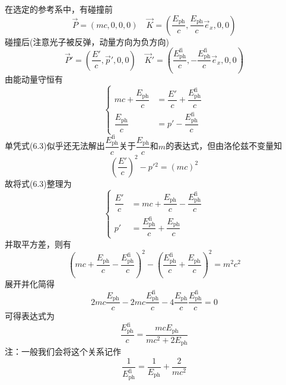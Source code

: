 \begin{solution}
在选定的参考系中，有碰撞前
\begin{equation}
	\vec{P} = (mc,0,0,0)\quad\vec{K}=(\dfrac{E_{\mathrm{ph}}}{c},\dfrac{E_{\mathrm{ph}}}{c}\vec{e}_x,0,0)
\end{equation}
碰撞后(注意光子被反弹，动量方向为负方向)
\begin{equation}
	\vec{P}'=(\dfrac{E'}{c},\vec{p}',0,0)\quad\vec{K}'=(\dfrac{E_{\mathrm{ph}}^{\mathrm{fi}}}{c},-\dfrac{E_{\mathrm{ph}}^{\mathrm{fi}}}{c}\vec{e}_x,0,0)
\end{equation}
由能动量守恒有
\begin{equation}
	\left\{
		\begin{aligned}
			mc+\dfrac{E_{\mathrm{ph}}}{c}&=\dfrac{E'}{c}+\dfrac{E_{\mathrm{ph}}^{\mathrm{fi}}}{c}\\
			\dfrac{E_{\mathrm{ph}}}{c}&=p'-\dfrac{E_{\mathrm{ph}}^{\mathrm{fi}}}{c}
		\end{aligned}
	\right.
\end{equation}
单凭式(6.3)似乎还无法解出$\dfrac{E_{\mathrm{ph}}^{\mathrm{fi}}}{c}$关于$ \dfrac{E_{\mathrm{ph}}}{c}$和$m$的表达式，但由洛伦兹不变量知
\begin{equation}
	\left(\dfrac{E'}{c}\right)^2-p'{}^2=(mc)^2
\end{equation}
故将式(6.3)整理为
\begin{equation}
	\left\{
	\begin{aligned}
		\dfrac{E'}{c}&=mc+\dfrac{E_{\mathrm{ph}}}{c}-\dfrac{E_{\mathrm{ph}}^{\mathrm{fi}}}{c}\\
		p'&=\dfrac{E_{\mathrm{ph}}^{\mathrm{fi}}}{c}+\dfrac{E_{\mathrm{ph}}}{c}
	\end{aligned}
	\right.
\end{equation}
并取平方差，则有
\begin{equation}
	\left(mc+\dfrac{E_{\mathrm{ph}}}{c}-\dfrac{E_{\mathrm{ph}}^{\mathrm{fi}}}{c}\right)^2-\left(\dfrac{E_{\mathrm{ph}}^{\mathrm{fi}}}{c}+\dfrac{E_{\mathrm{ph}}}{c}\right)^2=m^2c^2
\end{equation}
展开并化简得
\begin{equation}
	2mc\dfrac{E_{\mathrm{ph}}}{c}-2mc\dfrac{E_{\mathrm{ph}}^{\mathrm{fi}}}{c}-4\dfrac{E_{\mathrm{ph}}}{c}\dfrac{E_{\mathrm{ph}}^{\mathrm{fi}}}{c}=0
\end{equation}
可得表达式为
\begin{equation}
	\dfrac{E_{\mathrm{ph}}^{\mathrm{fi}}}{c}=\dfrac{mcE_{\mathrm{ph}}}{mc^2+2E_{\mathrm{ph}}}
\end{equation}
注：一般我们会将这个关系记作
\begin{equation}
	\dfrac{1}{E_{\mathrm{ph}}^{\mathrm{fi}}}=\dfrac{1}{E_{\mathrm{ph}}}+\dfrac{2}{mc^2}
\end{equation}
\end{solution}